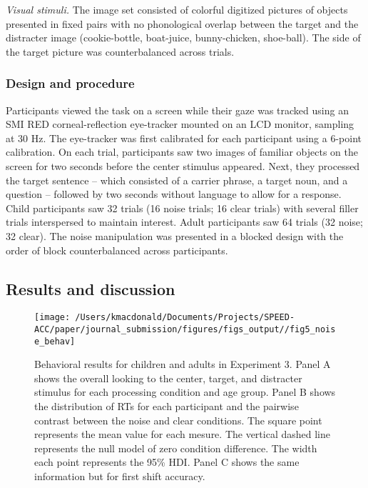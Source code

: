 \documentclass[english,floatsintext,man]{apa6}
\begin{document}
\emph{Visual stimuli.} The image set consisted of colorful digitized
pictures of objects presented in fixed pairs with no phonological
overlap between the target and the distracter image (cookie-bottle,
boat-juice, bunny-chicken, shoe-ball). The side of the target picture
was counterbalanced across trials.

\hypertarget{design-and-procedure-1}{%
\subsubsection{Design and procedure}\label{design-and-procedure-1}}

Participants viewed the task on a screen while their gaze was tracked
using an SMI RED corneal-reflection eye-tracker mounted on an LCD
monitor, sampling at 30 Hz. The eye-tracker was first calibrated for
each participant using a 6-point calibration. On each trial,
participants saw two images of familiar objects on the screen for two
seconds before the center stimulus appeared. Next, they processed the
target sentence -- which consisted of a carrier phrase, a target noun,
and a question -- followed by two seconds without language to allow for
a response. Child participants saw 32 trials (16 noise trials; 16 clear
trials) with several filler trials interspersed to maintain interest.
Adult participants saw 64 trials (32 noise; 32 clear). The noise
manipulation was presented in a blocked design with the order of block
counterbalanced across participants.

\hypertarget{results-and-discussion-1}{%
\subsection{Results and discussion}\label{results-and-discussion-1}}

\begin{figure}[!t]

{\centering \texttt{[image: /Users/kmacdonald/Documents/Projects/SPEED-ACC/paper/journal\_submission/figures/figs\_output//fig5\_noise\_behav]} 

}

\caption{Behavioral results for children and adults in Experiment 3. Panel A shows the overall looking to the center, target, and distracter stimulus for each processing condition and age group. Panel B shows the distribution of RTs for each participant and the pairwise contrast between the noise and clear conditions. The square point represents the mean value for each mesure. The vertical dashed line represents the null model of zero condition difference. The width each point represents the 95\% HDI. Panel C shows the same information but for first shift accuracy.}\label{fig:noise-acc-rt-plot}
\end{figure}
\end{document}
